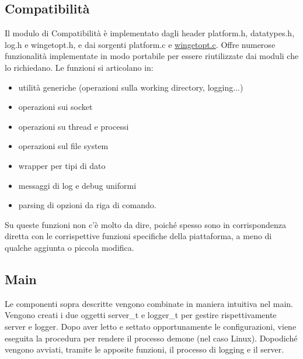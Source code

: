 \documentclass{article}
\begin{document}
\subsection{Compatibilità}
Il modulo di Compatibilità è implementato dagli header platform.h, datatypes.h, log.h e wingetopt.h, e dai 
sorgenti platform.c e \href{http://note.sonots.com/Comp/CompLang/cpp/getopt.html}{wingetopt.c}.
Offre numerose funzionalità implementate in modo portabile per essere riutilizzate
dai moduli che lo richiedano. Le funzioni si articolano in:
\begin{itemize}
    \item utilità generiche (operazioni sulla working directory, logging...)
    \item operazioni sui socket
    \item operazioni su thread e processi
    \item operazioni sul file system
    \item wrapper per tipi di dato
    \item messaggi di log e debug uniformi
    \item parsing di opzioni da riga di comando.
\end{itemize}
Su queste funzioni non c'è molto da dire, poiché spesso sono in corrispondenza diretta con le corrispettive funzioni
specifiche della piattaforma, a meno di qualche aggiunta o piccola modifica.

\subsection{Main}
Le componenti sopra descritte vengono combinate in maniera intuitiva nel main.
Vengono creati i due oggetti server\_t e logger\_t per gestire rispettivamente server e logger.
Dopo aver letto e settato opportunamente le configurazioni, viene eseguita la 
procedura per rendere il processo demone (nel caso Linux). Dopodiché vengono avviati, tramite le apposite 
funzioni, il processo di logging e il server.
\end{document}
